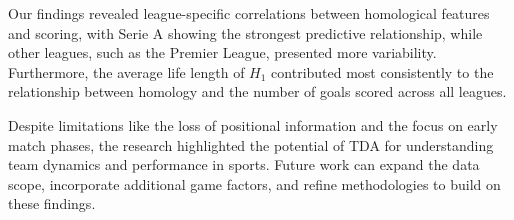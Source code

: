 \documentclass[10pt,twocolumn]{article}
\begin{document}
Our findings revealed league-specific correlations between homological features and scoring, with Serie A showing the strongest predictive relationship, while other leagues, such as the Premier League, presented more variability. Furthermore, the average life length of $ H_1 $ contributed most consistently to the relationship between homology and the number of goals scored across all leagues.

Despite limitations like the loss of positional information and the focus on early match phases, the research highlighted the potential of TDA for understanding team dynamics and performance in sports. Future work can expand the data scope, incorporate additional game factors, and refine methodologies to build on these findings.

\printbibliography

\begin{quote}
\end{quote}
\end{document}

